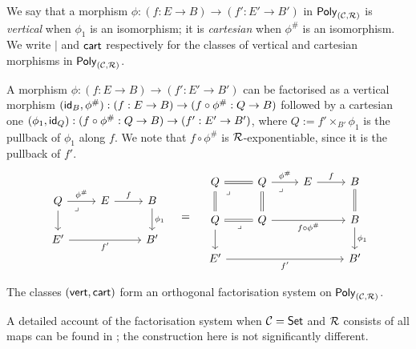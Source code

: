 \begin{definition}\label{def:vert-cart-ofs}
  We say that a morphism $\phi : (f : E \to B) \to (f' : E' \to B')$ in $\mathsf{Poly}_{(\mathcal{C},\mathcal{R})}$
  is \emph{vertical} when $\phi_1$ is an isomorphism;
  it is \emph{cartesian} when $\phi^\#$ is an isomorphism.
  We write $\vert$ and $\mathsf{cart}$ respectively for
  the classes of vertical and cartesian morphisms in $\mathsf{Poly}_{(\mathcal{C},\mathcal{R})}$.
\end{definition}
  A morphism
  $\phi : (f : E \to B) \to (f' : E' \to B')$
  can be factorised as a vertical morphism
  $(\mathsf{id}_B, \phi^\#) : (f : E \to B) \to (f \circ \phi^\# : Q \to B)$
  followed by a cartesian one
  $(\phi_1, \mathsf{id}_{Q}) : (f \circ \phi^\# : Q \to B) \to (f' : E' \to B')$,
  where $Q := f' \times_{B'} \phi_1$ is the pullback of $\phi_1$ along $f$.
  We note that $f \circ \phi^\#$ is $\mathcal{R}$-exponentiable,
  since it is the pullback of $f'$.
  \[
  \begin{tikzcd}
    {Q} & E & B \\
    {E'} && {B'}
    \arrow["{\phi^\#}", from=1-1, to=1-2]
    \arrow[from=1-1, to=2-1]
    \arrow["f", from=1-2, to=1-3]
    \arrow["{\phi_1}", from=1-3, to=2-3]
    \arrow["{f'}"', from=2-1, to=2-3]
    \arrow["\lrcorner"{anchor=center, pos=0.125}, draw=none, from=1-1, to=2-3]
  \end{tikzcd}
  \quad = \quad
  \begin{tikzcd}
    {Q} & {Q} & E & B \\
    {Q} & {Q} && B \\
    {E'} &&& {B'}
    \arrow[equals, from=1-1, to=1-2]
    \arrow[equals, from=1-1, to=2-1]
    \arrow["\lrcorner"{anchor=center, pos=0.125}, draw=none, from=1-1, to=2-2]
    \arrow["{\phi^\#}", from=1-2, to=1-3]
    \arrow[equals, from=1-2, to=2-2]
    \arrow["\lrcorner"{anchor=center, pos=0.125}, draw=none, from=1-2, to=2-4]
    \arrow["f", from=1-3, to=1-4]
    \arrow[equals, from=1-4, to=2-4]
    \arrow[equals, from=2-1, to=2-2]
    \arrow[from=2-1, to=3-1]
    \arrow["\lrcorner"{anchor=center, pos=0.125}, draw=none, from=2-1, to=3-4]
    \arrow["{f \circ \phi^\#}"', from=2-2, to=2-4]
    \arrow["{\phi_1}", from=2-4, to=3-4]
    \arrow["{f'}"', from=3-1, to=3-4]
  \end{tikzcd}
  \]
\begin{proposition}
  The classes $(\mathsf{vert},\mathsf{cart})$
  form an orthogonal factorisation system on $\mathsf{Poly}_{(\mathcal{C},\mathcal{R})}$.
\end{proposition}
A detailed account of the factorisation system when $\mathcal{C} = \mathsf{Set}$ and $\mathcal{R}$ consists of all maps 
can be found in \cite[Section 5.5]{niu2025};
the construction here is not significantly different.

